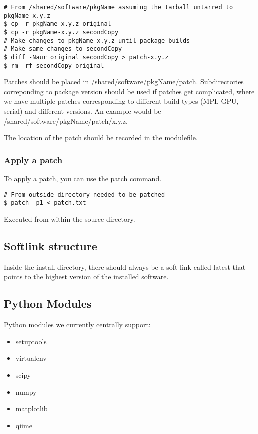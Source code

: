 \documentclass{article}
\begin{document}
\begin{verbatim}
# From /shared/software/pkgName assuming the tarball untarred to pkgName-x.y.z
$ cp -r pkgName-x.y.z original
$ cp -r pkgName-x.y.z secondCopy
# Make changes to pkgName-x.y.z until package builds
# Make same changes to secondCopy
$ diff -Naur original secondCopy > patch-x.y.z
$ rm -rf secondCopy original
\end{verbatim}

Patches should be placed in /shared/software/pkgName/patch.  Subdirectories 
correponding to package version should be used if patches get complicated, 
where we have multiple patches corresponding to different build types (MPI, 
GPU, serial) and different versions.  An example would be 
/shared/software/pkgName/patch/x.y.z.

The location of the patch should be recorded in the modulefile.

\subsubsection{Apply a patch}

To apply a patch, you can use the patch command.

\begin{verbatim}
# From outside directory needed to be patched
$ patch -p1 < patch.txt
\end{verbatim}

\noindent Executed from within the source directory.

\subsection{Softlink structure}

Inside the install directory, there should always be a soft link called latest 
that points to the highest version of the installed software.

\subsection{Python Modules}

Python modules we currently centrally support:

\begin{itemize}
	\item setuptools
	\item virtualenv
	\item scipy
	\item numpy
	\item matplotlib
	\item qiime
\end{itemize}
\end{document}
